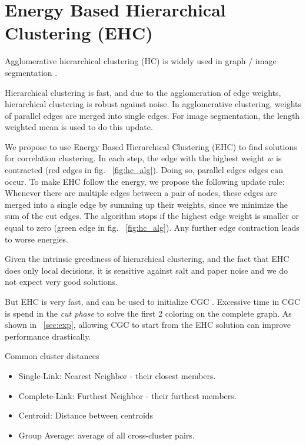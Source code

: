 \documentclass[10pt,twocolumn,letterpaper]{article}
\begin{document}
\section{Energy Based Hierarchical Clustering (EHC)}

Agglomerative hierarchical clustering (HC) is widely used
in graph / image segmentation
\cite{arbelaez_2006}.



Hierarchical clustering is fast, and 
due to the agglomeration of edge weights, 
hierarchical clustering is robust against noise.
In agglomerative clustering, weights of
parallel edges are merged into single edges.
For image segmentation, the length
weighted mean is used to do this update.

We propose to use Energy Based Hierarchical Clustering (EHC) to find
solutions for correlation clustering.
In each step, the edge with the highest weight $w$ is
contracted (red edges in fig. ~\ref{fig:hc_alg}).
Doing so, parallel edges edges can occur.
To make EHC follow the energy, we propose 
the following update rule:
Whenever there are multiple edges between 
a pair of nodes, these edges are merged into a single edge
by summing up their weights, since we 
minimize the sum of the cut edges.
The algorithm stops if the highest edge weight is
smaller or equal to zero  (green edge in fig. ~\ref{fig:hc_alg}). Any further edge
contraction leads to worse energies.

Given the intrinsic greediness of hierarchical clustering, 
and the fact that EHC does only local decisions, it is 
sensitive against salt and paper noise 
and we do not expect very good solutions.

But EHC is very fast, and can be used to initialize
CGC \cite{beier_2014_cvpr}. Excessive time in CGC
is spend in the \emph{cut phase} to solve the 
first 2 coloring on the complete graph.
As shown in ~\ref{sec:exp},
allowing CGC to start from the EHC solution
can improve performance drastically.






Common cluster distances
\begin{itemize}
\item Single-Link: Nearest Neighbor - their closest members.
\item Complete-Link: Furthest Neighbor - their furthest members.
\item Centroid: Distance between centroids
\item Group Average: average of all cross-cluster pairs.
\end{itemize}
\end{document}
